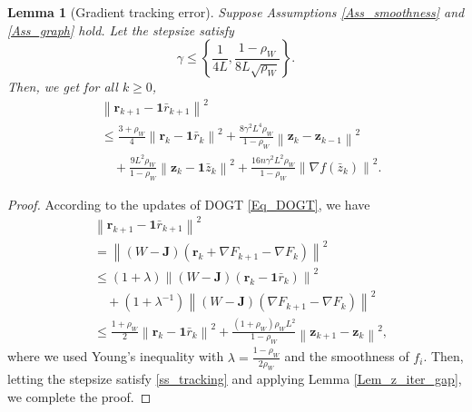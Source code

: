 \documentclass[10pt,a4paper]{amsart}
\newtheorem{Lem}{Lemma}
\begin{document}
\begin{Lem}[Gradient tracking error]\label{Lem_track}
Suppose Assumptions \ref{Ass_smoothness} and \ref{Ass_graph} hold. Let the stepsize satisfy
\begin{equation}\label{ss_tracking}
\gamma \leqslant \left\{ \frac{1}{4L}, \frac{1-\rho _W}{8L\sqrt{\rho _W}} \right\}.
\end{equation}
Then, we get for all $k \geqslant 0$,
\begin{equation}
\begin{aligned}
&\left\| \mathbf{r}_{k+1}-\mathbf{1}\bar{r}_{k+1} \right\| ^2
\\
&\leqslant \frac{3+\rho _W}{4}\left\| \mathbf{r}_k-\mathbf{1}\bar{r}_k \right\| ^2+\frac{8\gamma ^2L^4\rho _W}{1-\rho _W}\left\| \mathbf{z}_k-\mathbf{z}_{k-1} \right\| ^2
\\
&\quad +\frac{9L^2\rho _W}{1-\rho _W}\left\| \mathbf{z}_k-\mathbf{1}\bar{z}_k \right\| ^2+\frac{16n\gamma ^2L^2\rho _W}{1-\rho _W}\left\| \nabla f\left( \bar{z}_k \right) \right\| ^2.
\end{aligned}
\end{equation}
\end{Lem}

\begin{proof}
According to the updates of DOGT \eqref{Eq_DOGT}, we have
\begin{equation*}
\begin{aligned}
&\left\| \mathbf{r}_{k+1}-\mathbf{1}\bar{r}_{k+1} \right\| ^2
\\
&=\left\| \left( W-\mathbf{J} \right) \left( \mathbf{r}_k+\nabla F_{k+1}-\nabla F_k \right) \right\| ^2
\\
&\leqslant \left( 1+\lambda \right) \left\| \left( W-\mathbf{J} \right) \left( \mathbf{r}_k-\mathbf{1}\bar{r}_k \right) \right\| ^2
\\
&\quad+\left( 1+\lambda ^{-1} \right) \left\| \left( W-\mathbf{J} \right) \left( \nabla F_{k+1}-\nabla F_k \right) \right\| ^2
\\
&\leqslant \frac{1+\rho _W}{2}\left\| \mathbf{r}_k-\mathbf{1}\bar{r}_k \right\| ^2+\frac{\left( 1+\rho _W \right) \rho _WL^2}{1-\rho _W}\left\| \mathbf{z}_{k+1}-\mathbf{z}_k \right\| ^2,
\end{aligned}
\end{equation*}
where we used Young's inequality with $\lambda =\frac{1-\rho _W}{2\rho _W}$ and the smoothness of $f_i$. Then, 
letting the stepsize satisfy \eqref{ss_tracking} and applying Lemma \ref{Lem_z_iter_gap}, we complete the proof.
\end{proof}
\end{document}

